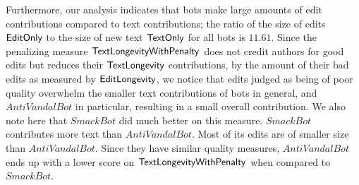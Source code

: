 Furthermore, our analysis indicates that bots make large amounts of
edit contributions compared to text contributions; the ratio
of the size of edits $\mathsf{EditOnly}$ to the size of new text $\mathsf{TextOnly}$
for all bots is $11.61$.
Since the penalizing measure $\mathsf{TextLongevityWithPenalty}$ does not credit authors for
good edits but reduces their $\mathsf{TextLongevity}$ contributions, by the 
amount of their bad edits as measured by $\mathsf{EditLongevity}$, we notice that 
edits judged as being of poor quality overwhelm the smaller text 
contributions of bots in general, and $AntiVandalBot$ in particular, 
resulting in a small overall contribution.
We also note here that $SmackBot$ did much better on this
measure.
$SmackBot$ contributes more text than $AntiVandalBot$.
Most of its edits are of smaller size than $AntiVandalBot$.
Since they have similar quality measures, $AntiVandalBot$ ends
up with a lower score on $\mathsf{TextLongevityWithPenalty}$ when compared to $SmackBot$.

